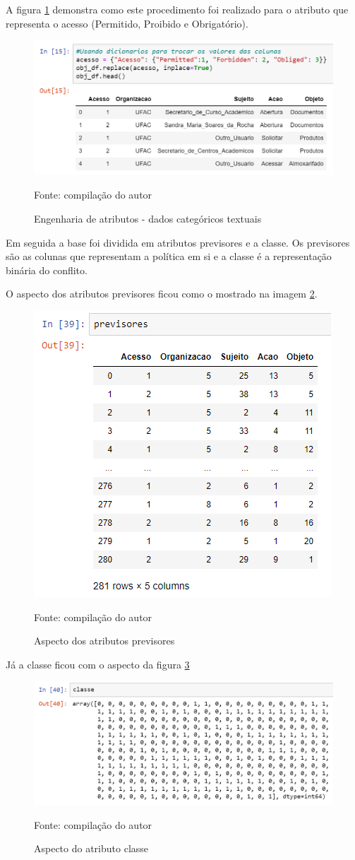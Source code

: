 A figura \ref{fig:dic-coluna1} demonstra como este procedimento foi realizado para o atributo que representa o acesso (Permitido, Proibido e Obrigatório).

\begin{figure}[h!]
	\centering
	\includegraphics[width=.6\textwidth]{imagens/notebook-base2.png}
	\caption{Engenharia de atributos - dados categóricos textuais}
	\label{fig:dic-coluna1}
	{\scriptsize Fonte: compilação do autor}
\end{figure}

Em seguida a base foi dividida em atributos previsores e a classe. Os previsores são as colunas que representam a política em si e a classe é a representação binária do conflito.

O aspecto dos atributos previsores ficou como o mostrado na imagem \ref{fig:previsores}.

\begin{figure}[h!]
	\centering
	\includegraphics[width=.6\textwidth]{imagens/previsores.png}
	\caption{Aspecto dos atributos previsores}
	\label{fig:previsores}
	{\scriptsize Fonte: compilação do autor}
\end{figure}

Já a classe ficou com o aspecto da figura \ref{fig:classe}

\begin{figure}[h!]
	\centering
	\includegraphics[width=.6\textwidth]{imagens/classe.png}
	\caption{Aspecto do atributo classe}
	\label{fig:classe}
	{\scriptsize Fonte: compilação do autor}
\end{figure}


